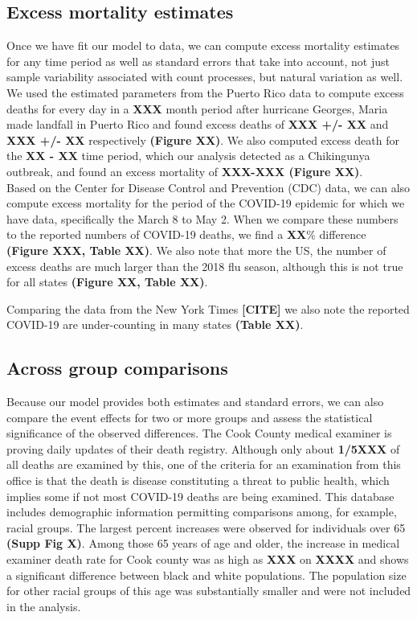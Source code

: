 \documentclass[11pt]{article}
\begin{document}
\subsection{Excess mortality estimates}
\label{subsec:excess-mortality}
Once we have fit our model to data, we can compute excess mortality estimates for any time period as well as standard errors that take into account, not just sample variability associated with count processes, but natural variation as well. We used the estimated parameters from the Puerto Rico data to compute excess deaths for every day in a \textbf{XXX} month period after hurricane Georges, Maria made landfall in Puerto Rico and found excess deaths of \textbf{XXX +/- XX} and \textbf{XXX +/- XX} respectively \textbf{(Figure XX)}. We also computed excess death for the \textbf{XX - XX} time period, which our analysis detected as a Chikingunya outbreak, and found an excess mortality of \textbf{XXX-XXX (Figure XX)}. \\ 

Based on the Center for Disease Control and Prevention (CDC) data, we can also compute excess mortality for the period of the COVID-19 epidemic for which we have data, specifically the March 8 to May 2. When we compare these numbers to the reported numbers of COVID-19 deaths, we find a \textbf{XX}\% difference \textbf{(Figure XXX, Table XX)}. We also note that more the US, the number of excess deaths are much larger than the 2018 flu season, although this is not true for all states \textbf{(Figure XX, Table XX)}.

Comparing the data from the New York Times \textbf{[CITE]} we also note the reported COVID-19 are under-counting in many states \textbf{(Table XX)}.

\subsection{Across group comparisons}
\label{subsec:group-comparison}
Because our model provides both estimates and standard errors, we can also compare the event effects for two or more groups and assess the statistical significance of the observed differences. The Cook County medical examiner is proving daily updates of their death registry. Although only about \textbf{1/5XXX} of all deaths are examined by this, one of the criteria for an examination from this office is that the death is disease constituting a threat to public health, which implies some if not most COVID-19 deaths are being examined. This database includes demographic information permitting comparisons among, for example, racial groups. The largest percent increases were observed for individuals over 65 \textbf{(Supp Fig X)}. Among those 65 years of age and older, the increase in medical examiner death rate for Cook county was as high as \textbf{XXX} on \textbf{XXXX} and shows a significant difference between black and white populations. The population size for other racial groups of this age was substantially smaller and were not included in the analysis.
 
\end{document}
